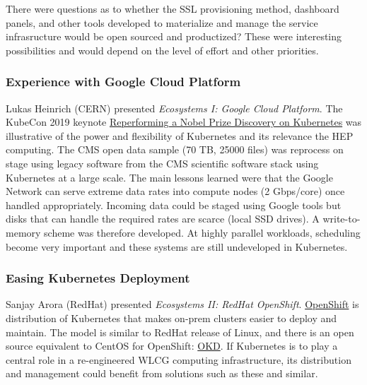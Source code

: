 \documentclass[11pt,letterpaper,fleqn]{article}
\begin{document}
There were questions as to whether the SSL provisioning method, dashboard panels, and other tools developed to materialize and manage the service infrasructure would be open sourced and productized?  These were interesting possibilities and would depend on the level of effort and other priorities.


\subsubsection{Experience with Google Cloud Platform}

Lukas Heinrich (CERN) presented {\it Ecosystems I: Google Cloud Platform}.  The KubeCon 2019 keynote \href{https://sched.co/MRyv}{Reperforming a Nobel Prize Discovery on Kubernetes} was illustrative of the power and flexibility of Kubernetes and its relevance the HEP computing.  The CMS open data sample (70 TB, 25000 files) was reprocess on stage using legacy software from the CMS scientific software stack using Kubernetes at a large scale.  The main lessons learned were that the Google Network can serve extreme data rates into compute nodes (2 Gbps/core) once handled appropriately. Incoming data could be staged using Google tools but disks that can handle the required rates are scarce (local SSD drives).  A write-to-memory scheme was therefore developed. At highly parallel workloads, scheduling become very important and these systems are still undeveloped in Kubernetes.

\subsubsection{Easing Kubernetes Deployment}

Sanjay Arora (RedHat) presented {\it Ecosystems II: RedHat OpenShift}.  \href{https://www.openshift.com/}{OpenShift} is distribution of Kubernetes that makes on-prem clusters easier to deploy and maintain.  The model is similar to RedHat release of Linux, and there is an open source equivalent to CentOS for OpenShift: \href{https://www.okd.io/}{OKD}.  If Kubernetes is to play a central role in a re-engineered WLCG computing infrastructure, its distribution and management could benefit from solutions such as these and similar.


\end{document}
